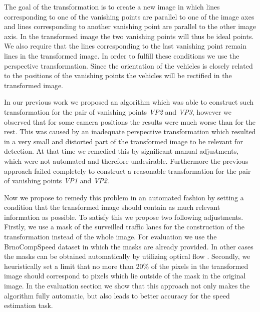 \documentclass[twocolumn]{svjour3}          \smartqed  \usepackage{graphicx}
\begin{document}
The goal of the transformation is to create a new image in which lines corresponding to one of the vanishing points are parallel to one of the image axes and lines corresponding to another vanishing point are parallel to the other image axis. In the transformed image the two vanishing points will thus be ideal points. We also require that the lines corresponding to the last vanishing point remain lines in the transformed image. In order to fulfill these conditions we use the perspective transformation. Since the orientation of the vehicles is closely related to the positions of the vanishing points the vehicles will be rectified in the transformed image.

In our previous work \cite{CVWW2019} we proposed an algorithm which was able to construct such transformation for the pair of vanishing points \textit{VP2} and \textit{VP3}, however we observed that for some camera positions the results were much worse than for the rest. This was caused by an inadequate perspective transformation which resulted in a very small and distorted part of the transformed image to be relevant for detection. At that time we remedied this by significant manual adjustments, which were not automated and therefore undesirable. Furthermore the previous approach failed completely to construct a reasonable transformation for the pair of vanishing points \textit{VP1} and \textit{VP2}.

Now we propose to remedy this problem in an automated fashion by setting a condition that the transformed image should contain as much relevant information as possible. To satisfy this we propose two following adjustments. Firstly, we use a mask of the surveilled traffic lanes for the construction of the transformation instead of the whole image. For evaluation we use the BrnoCompSpeed dataset \cite{brnocompspeed} in which the masks are already provided. In other cases the masks can be obtained automatically by utilizing optical flow \cite{opticalflow}. Secondly, we heuristically set a limit that no more than 20\% of the pixels in the transformed image should correspond to pixels which lie outside of the mask in the original image. In the evaluation section we show that this approach not only makes the algorithm fully automatic, but also leads to better accuracy for the speed estimation task.
\end{document}
